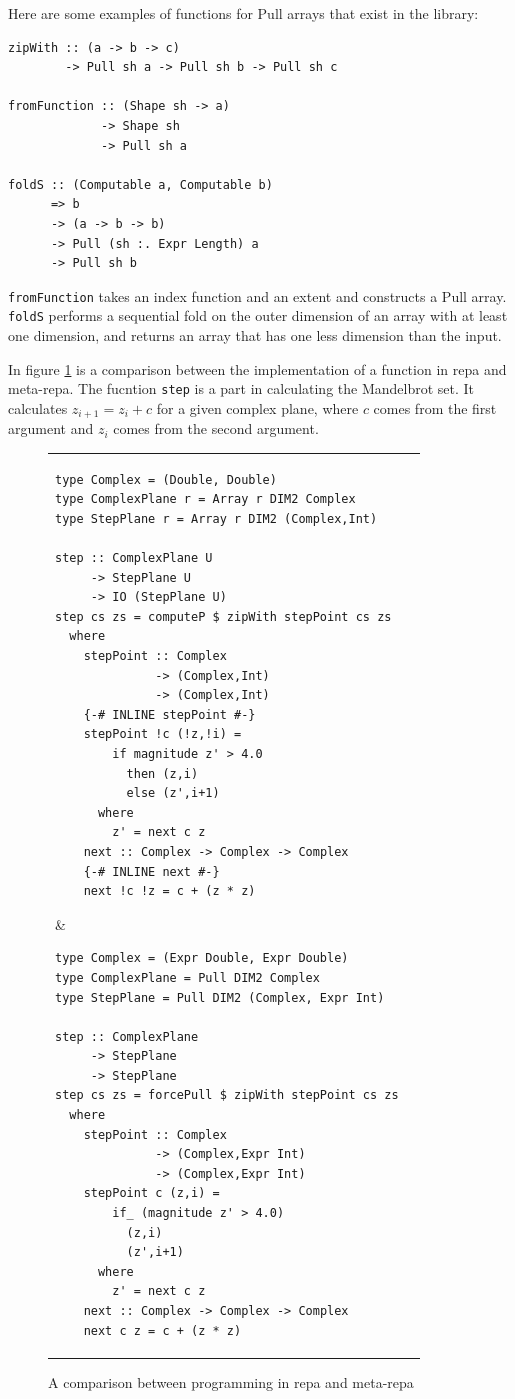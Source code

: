 \documentclass[preprint]{sigplanconf}
\begin{document}
Here are some examples of functions for Pull arrays that exist in the
library:

\begin{verbatim}
zipWith :: (a -> b -> c) 
        -> Pull sh a -> Pull sh b -> Pull sh c

fromFunction :: (Shape sh -> a) 
             -> Shape sh 
             -> Pull sh a

foldS :: (Computable a, Computable b)
      => b
      -> (a -> b -> b)
      -> Pull (sh :. Expr Length) a
      -> Pull sh b
\end{verbatim}

\texttt{fromFunction} takes an index function and an extent and
constructs a Pull array. \texttt{foldS} performs a sequential fold on
the outer dimension of an array with at least one dimension, and returns
an array that has one less dimension than the input.

In figure \ref{fig:comparison} is a comparison between the
implementation of a function in repa and meta-repa. The fucntion
\texttt{step} is a part in calculating the Mandelbrot set. It calculates
$z_{i+1} = z_i + c$ for a given complex plane, where $c$ comes from the
first argument and $z_i$ comes from the second argument.

\begin{figure}
\begin{tabular}{p{\columnwidth} | p{\columnwidth}}

\begin{verbatim}
type Complex = (Double, Double)
type ComplexPlane r = Array r DIM2 Complex
type StepPlane r = Array r DIM2 (Complex,Int)

step :: ComplexPlane U 
     -> StepPlane U
     -> IO (StepPlane U)
step cs zs = computeP $ zipWith stepPoint cs zs
  where
    stepPoint :: Complex
              -> (Complex,Int)
              -> (Complex,Int)
    {-# INLINE stepPoint #-}
    stepPoint !c (!z,!i) =
        if magnitude z' > 4.0 
          then (z,i)
          else (z',i+1)
      where
        z' = next c z
    next :: Complex -> Complex -> Complex
    {-# INLINE next #-}
    next !c !z = c + (z * z)
\end{verbatim}
&
\begin{verbatim}
type Complex = (Expr Double, Expr Double)
type ComplexPlane = Pull DIM2 Complex
type StepPlane = Pull DIM2 (Complex, Expr Int)

step :: ComplexPlane 
     -> StepPlane
     -> StepPlane
step cs zs = forcePull $ zipWith stepPoint cs zs
  where
    stepPoint :: Complex 
              -> (Complex,Expr Int)
              -> (Complex,Expr Int)
    stepPoint c (z,i) =
        if_ (magnitude z' > 4.0)
          (z,i)
          (z',i+1)
      where
        z' = next c z
    next :: Complex -> Complex -> Complex
    next c z = c + (z * z)
\end{verbatim}
\end{tabular}
\caption{A comparison between programming in repa and meta-repa}
\label{fig:comparison}
\end{figure}
\end{document}
